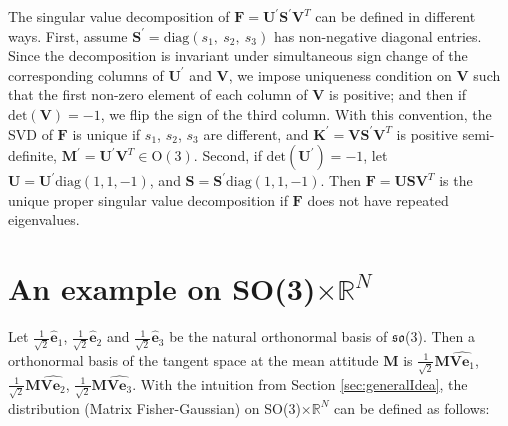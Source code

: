\documentclass[12pt]{article}
\begin{document}
The singular value decomposition of $\mathbf{F} = \mathbf{U^\prime}\mathbf{S^\prime}\mathbf{V}^T$ can be defined in different ways.
First, assume $\mathbf{S}^\prime = \mathrm{diag}(s_1,\ s_2,\ s_3)$ has non-negative diagonal entries.
Since the decomposition is invariant under simultaneous sign change of the corresponding columns of $\mathbf{U}^\prime$ and $\mathbf{V}$, we impose uniqueness condition on $\mathbf{V}$ such that the first non-zero element of each column of $\mathbf{V}$ is positive; and then if $\mathrm{det}(\mathbf{V})=-1$, we flip the sign of the third column.
With this convention, the SVD of $\mathbf{F}$ is unique if $s_1$, $s_2$, $s_3$ are different, and $\mathbf{K}^\prime = \mathbf{V}\mathbf{S}^\prime\mathbf{V}^T$ is positive semi-definite, $\mathbf{M}^\prime = \mathbf{U}^\prime\mathbf{V}^T\in\mathrm{O}(3)$.
Second, if $\mathrm{det}(\mathbf{U}^\prime)=-1$, let $\mathbf{U} = \mathbf{U}^\prime\mathrm{diag}(1,1,-1)$, and $\mathbf{S} = \mathbf{S}^\prime\mathrm{diag}(1,1,-1)$.
Then $\mathbf{F} = \mathbf{U}\mathbf{S}\mathbf{V}^T$ is the unique proper singular value decomposition if $\mathbf{F}$ does not have repeated eigenvalues.


\section{An example on SO(3)$\times\mathbb{R}^N$}

Let $\frac{1}{\sqrt{2}}\hat{\bm{e}}_1$, $\frac{1}{\sqrt{2}}\hat{\bm{e}}_2$ and $\frac{1}{\sqrt{2}}\hat{\bm{e}}_3$ be the natural orthonormal basis of $\mathfrak{so}$(3).
Then a orthonormal basis of the tangent space at the mean attitude $\mathbf{M}$ is $\frac{1}{\sqrt{2}}\mathbf{M}\widehat{\mathbf{V}\bm{e}_1}$, $\frac{1}{\sqrt{2}}\mathbf{M}\widehat{\mathbf{V}\bm{e}_2}$, $\frac{1}{\sqrt{2}}\mathbf{M}\widehat{\mathbf{V}\bm{e}_3}$.
With the intuition from Section \ref{sec:generalIdea}, the distribution (Matrix Fisher-Gaussian) on SO(3)$\times\mathbb{R}^N$ can be defined as follows:
\end{document}

